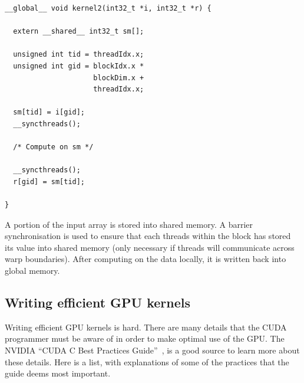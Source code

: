 \documentclass[a4paper]{book}
\begin{document}
\begin{small}
\begin{Verbatim}[samepage=true]
__global__ void kernel2(int32_t *i, int32_t *r) {

  extern __shared__ int32_t sm[]; 

  unsigned int tid = threadIdx.x; 
  unsigned int gid = blockIdx.x * 
                     blockDim.x + 
                     threadIdx.x;

  sm[tid] = i[gid]; 
  __syncthreads();

  /* Compute on sm */ 
     
  __syncthreads();
  r[gid] = sm[tid]; 
  
}
\end{Verbatim} 
\end{small} 

\noindent A portion of the input array is stored into shared memory. A 
barrier synchronisation is used to ensure that each threads within the block 
has stored its value into shared memory (only necessary if threads will 
communicate across warp boundaries). After computing on the data locally, 
it is written back into global memory. 


\subsection{Writing efficient GPU kernels} 
\label{sec:efficient}

Writing efficient GPU kernels is hard. There are many details that the CUDA 
programmer must be aware of in order to make optimal use of the GPU. 
The NVIDIA ``CUDA C Best Practices Guide''~\citet{BestPrac}, is a good source 
to learn more about these details. Here is a list, with explanations of some 
of the practices that the guide deems most important. 
\end{document}
